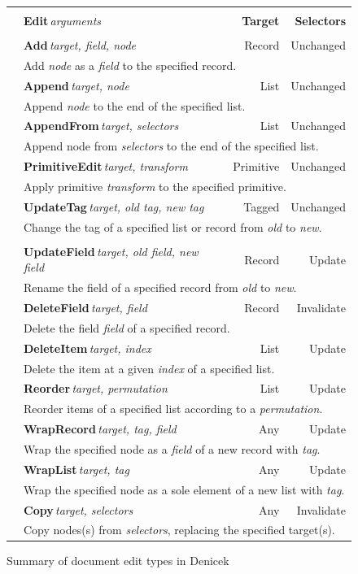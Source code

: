 \documentclass[sigconf]{acmart}
\begin{document}

\begin{figure}
\newcommand{\ektablecol}[6]{
\raisebox{-0.2em}{#1} & \sffamily\small{\bfseries #2}\,\;\textit{\footnotesize target, #3} & \sffamily\footnotesize #4 & \sffamily\footnotesize #5 \\[-0.2em]
&\multicolumn{3}{l|}{\sffamily\footnotesize #6}\\[0.3em]
}
\begin{tabular}{|cp{13em}rr|}
\hline
\rowcolor{ekgray}
&&&\\[-1em]
\rowcolor{ekgray}
 & \sffamily\small{\bfseries Edit}\;\,\textit{\footnotesize arguments} & \sffamily\footnotesize\bfseries Target & \sffamily\footnotesize\bfseries Selectors \\[0.2em]
\hline
&&&\\[-1em]
\ektablecol{\faPlus}{Add}{field, node}{Record}{Unchanged}
  {Add \textit{node} as a \textit{field} to the specified record.}
\ektablecol{\faAt}{Append}{node}{List}{Unchanged}
  {Append \textit{node} to the end of the specified list.}
\ektablecol{\faPaperclip}{AppendFrom}{selectors}{List}{Unchanged}
  {Append node from \emph{selectors} to the end of the specified list.}
\ektablecol{\faICursor}{PrimitiveEdit}{transform}{Primitive}{Unchanged}
  {Apply primitive \textit{transform} to the specified primitive.}
\ektablecol{\faCode}{UpdateTag}{old tag, new tag}{Tagged}{Unchanged}
  {Change the tag of a specified list or record from \textit{old} to \textit{new}.}
\hline
&&&\\[-1em]
\ektablecol{\faFont}{UpdateField}{old field, new field}{Record}{Update}
  {Rename the field of a specified record from \textit{old} to \textit{new}.}
\ektablecol{\faTimesCircle}{DeleteField}{field}{Record}{Invalidate}
  {Delete the field \textit{field} of a specified record.}
\ektablecol{\faMinusCircle}{DeleteItem}{index}{List}{Update}
  {Delete the item at a given \textit{index} of a specified list.}
\ektablecol{\faSort}{Reorder}{permutation}{List}{Update}
  {Reorder items of a specified list according to a \textit{permutation}.}
\ektablecol{\faFileO}{WrapRecord}{tag, field}{Any}{Update}
  {Wrap the specified node as a \textit{field} of a new record with \textit{tag}.}
\ektablecol{\faListUl}{WrapList}{tag}{Any}{Update}
  {Wrap the specified node as a sole element of a new list with \textit{tag}.}
\ektablecol{\faCopy}{Copy}{selectors}{Any}{Invalidate}
  {Copy nodes(s) from \textit{selectors}, replacing the specified target(s). }
\hline
\end{tabular}
\vspace{-0.5em}
\caption{Summary of document edit types in Denicek}
\label{fig:edits}
\vspace{-1em}
\end{figure}
\end{document}
